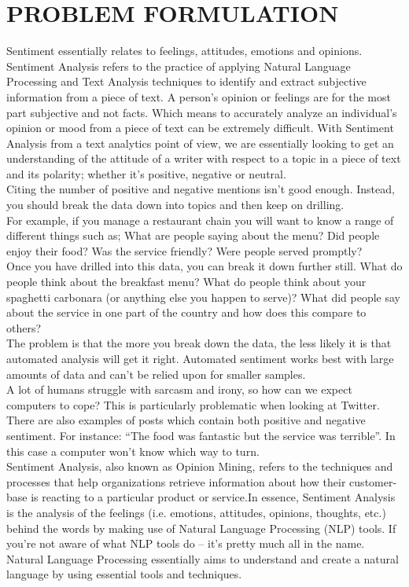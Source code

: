 \documentclass[preprint,12pt]{elsarticle}
\begin{document}
\section{PROBLEM FORMULATION}
\label{S:1}
Sentiment essentially relates to feelings, attitudes, emotions and opinions. Sentiment Analysis refers to the practice of applying Natural Language Processing and Text Analysis techniques to identify and extract subjective information from a piece of text. A person’s opinion or feelings are for the most part subjective and not facts. Which means to accurately analyze an individual’s opinion or mood from a piece of text can be extremely difficult. With Sentiment Analysis from a text analytics point of view, we are essentially looking to get an understanding of the attitude of a writer with respect to a topic in a piece of text and its polarity; whether it’s positive, negative or neutral.\\
Citing the number of positive and negative mentions isn’t good enough. Instead, you should break the data down into topics and then keep on drilling.\\
For example, if you manage a restaurant chain you will want to know a range of different things such as; What are people saying about the menu? Did people enjoy their food? Was the service friendly? Were people served promptly?\\
Once you have drilled into this data, you can break it down further still. What do people think about the breakfast menu? What do people think about your spaghetti carbonara (or anything else you happen to serve)? What did people say about the service in one part of the country and how does this compare to others?\\
The problem is that the more you break down the data, the less likely it is that automated analysis will get it right. Automated sentiment works best with large amounts of data and can’t be relied upon for smaller samples.\\
A lot of humans struggle with sarcasm and irony, so how can we expect computers to cope? This is particularly problematic when looking at Twitter.\\
There are also examples of posts which contain both positive and negative sentiment. For instance: “The food was fantastic but the service was terrible”. In this case a computer won’t know which way to turn.\\
Sentiment Analysis, also known as Opinion Mining, refers to the techniques and processes that help organizations retrieve information about how their customer-base is reacting to a particular product or service.In essence, Sentiment Analysis is the analysis of the feelings (i.e. emotions, attitudes, opinions, thoughts, etc.) behind the words by making use of Natural Language Processing (NLP) tools. If you’re not aware of what NLP tools do – it’s pretty much all in the name. Natural Language Processing essentially aims to understand and create a natural language by using essential tools and techniques.\\
\end{document}
